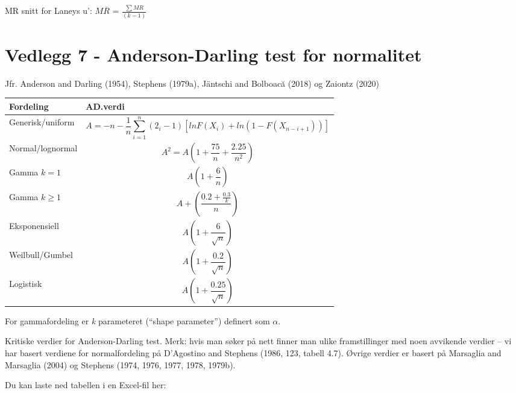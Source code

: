 \documentclass[
]{book}
\begin{document}
MR snitt for Laneys u': \(M\overline{R}\) = \(\frac{\sum{MR}}{(k-1)}\)

\hypertarget{vedlegg-7---anderson-darling-test-for-normalitet}{%
\chapter*{Vedlegg 7 - Anderson-Darling test for normalitet}\label{vedlegg-7---anderson-darling-test-for-normalitet}}

Jfr. Anderson and Darling (1954), Stephens (1979a), Jäntschi and Bolboacă (2018) og Zaiontz (2020)

\begin{table}[!h]
\centering
\begin{tabular}{>{\raggedright\arraybackslash}p{5cm}|>{\centering\arraybackslash}p{10cm}}
\hline
\textbf{Fordeling} & \textbf{AD.verdi}\\
\hline
Generisk/uniform & $$A=-n-\frac{1}{n}\sum_{i=1}^{n}(2_i-1)[lnF(X_i)+ln(1-F(X_{n-i+1}))]$$\\
\hline
Normal/lognormal & $$A^2=A(1+\frac{75}{n}+\frac{2.25}{n^2})$$\\
\hline
Gamma $k=1$ & $$A(1+\frac{6}{n})$$\\
\hline
Gamma $k\ge1$ & $$A+(\frac{0.2+\frac{0.3}{k}}{n})$$\\
\hline
Eksponensiell & $$A(1+\frac{6}{\sqrt{n}})$$\\
\hline
Weilbull/Gumbel & $$A(1+\frac{0.2}{\sqrt{n}})$$\\
\hline
Logistisk & $$A(1+\frac{0.25}{\sqrt{n}})$$\\
\hline
\end{tabular}
\end{table}

For gammafordeling er \emph{k} parameteret (``shape parameter'') definert som \(\alpha\).

Kritiske verdier for Anderson-Darling test. Merk: hvis man søker på nett finner man ulike framstillinger med noen avvikende verdier -- vi har basert verdiene for normalfordeling på D'Agostino and Stephens (1986, 123, tabell 4.7). Øvrige verdier er basert på Marsaglia and Marsaglia (2004) og Stephens (1974, 1976, 1977, 1978, 1979b).

Du kan laste ned tabellen i en Excel-fil her:
\end{document}
